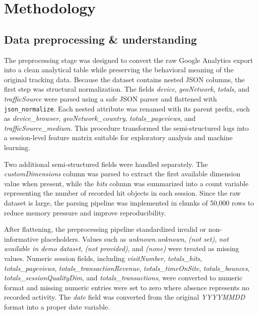 \documentclass[conference]{IEEEtran}
\begin{document}

\section{Methodology}

\subsection{Data preprocessing \& understanding}

The preprocessing stage was designed to convert the raw Google Analytics export into a clean analytical table while preserving the behavioral meaning of the original tracking data. Because the dataset contains nested JSON columns, the first step was structural normalization. The fields \textit{device}, \textit{geoNetwork}, \textit{totals}, and \textit{trafficSource} were parsed using a safe JSON parser and flattened with \texttt{json\_normalize}. Each nested attribute was renamed with its parent prefix, such as \textit{device\_browser}, \textit{geoNetwork\_country}, \textit{totals\_pageviews}, and \textit{trafficSource\_medium}. This procedure transformed the semi-structured logs into a session-level feature matrix suitable for exploratory analysis and machine learning.

Two additional semi-structured fields were handled separately. The \textit{customDimensions} column was parsed to extract the first available dimension value when present, while the \textit{hits} column was summarized into a count variable representing the number of recorded hit objects in each session. Since the raw dataset is large, the parsing pipeline was implemented in chunks of 50,000 rows to reduce memory pressure and improve reproducibility.

After flattening, the preprocessing pipeline standardized invalid or non-informative placeholders. Values such as \textit{unknown.unknown}, \textit{(not set)}, \textit{not available in demo dataset}, \textit{(not provided)}, and \textit{(none)} were treated as missing values. Numeric session fields, including \textit{visitNumber}, \textit{totals\_hits}, \textit{totals\_pageviews}, \textit{totals\_transactionRevenue}, \textit{totals\_timeOnSite}, \textit{totals\_bounces}, \textit{totals\_sessionQualityDim}, and \textit{totals\_transactions}, were converted to numeric format and missing numeric entries were set to zero where absence represents no recorded activity. The \textit{date} field was converted from the original \textit{YYYYMMDD} format into a proper date variable.
\end{document}
